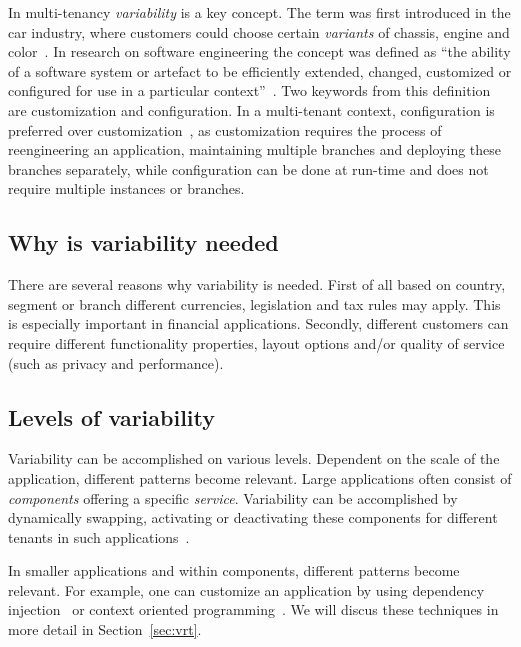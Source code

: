 In multi-tenancy \textit{variability} is a key concept. The term was first introduced in the car industry, where customers could choose certain \textit{variants} of chassis, engine and color~\cite[p. 153]{kabbedijk2011variability}. 
In research on software engineering the concept was defined as ``the ability of a software system or artefact to be efficiently extended, changed, customized or configured for use in a particular context''~\cite{svahnberg2005taxonomy}.
Two keywords from this definition are customization and configuration. 
In a multi-tenant context, configuration is preferred over customization~\cite{sun2008software}, as customization requires the process of reengineering an application, maintaining multiple branches and deploying these branches separately, while configuration can be done at run-time and does not require multiple instances or branches.

\subsection{Why is variability needed}
There are several reasons why variability is needed. 
First of all based on country, segment or branch different currencies, legislation and tax rules may apply. This is especially important in financial applications. 
Secondly, different customers can require different functionality properties, layout options and/or quality of service (such as privacy and performance).

\subsection{Levels of variability}
Variability can be accomplished on various levels. 
Dependent on the scale of the application, different patterns become relevant. Large applications often consist of \textit{components} offering a specific \textit{service}. Variability can be accomplished by dynamically swapping, activating or deactivating  these components for different tenants in such applications~\cite{mietzner2008defining}. 

In smaller applications and within components, different patterns become relevant. For example, one can customize an application by using dependency injection~\cite{walraven2011middleware} or context oriented programming~\cite{truyen2012context}. We will discus these techniques in more detail in Section~\ref{sec:vrt}.

